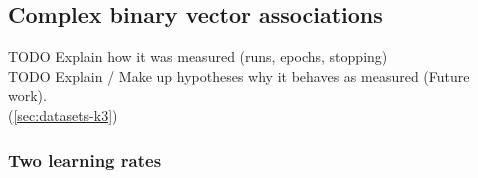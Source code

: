 

\subsection{Complex binary vector associations} 
\label{sec:results-k3}

TODO Explain how it was measured (runs, epochs, stopping) \\
TODO Explain / Make up hypotheses why it behaves as measured (Future work). \\

(\ref{sec:datasets-k3}) 


\subsubsection{Two learning rates} 
\label{sec:tlr-k3}

